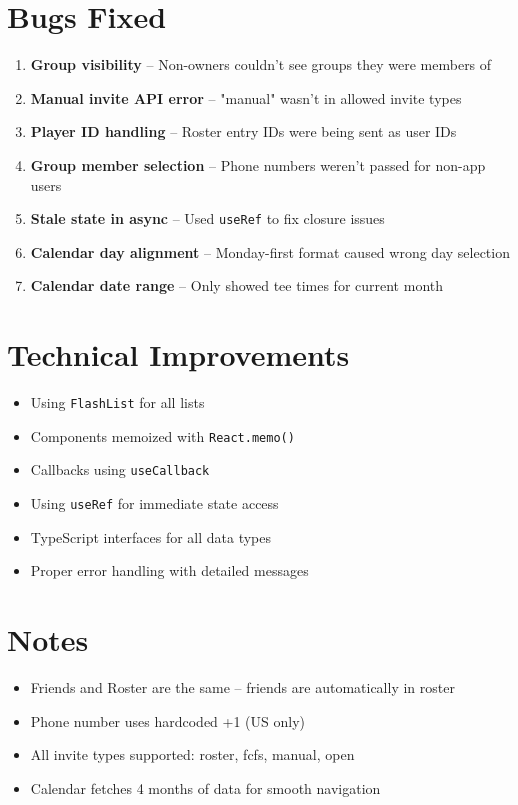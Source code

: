 \documentclass[11pt,a4paper]{article}
\newcommand{\done}{\textcolor{checkgreen}{$\checkmark$}}
\begin{document}
\section{Bugs Fixed}

\begin{enumerate}
    \item \textbf{Group visibility} -- Non-owners couldn't see groups they were members of
    \item \textbf{Manual invite API error} -- "manual" wasn't in allowed invite types
    \item \textbf{Player ID handling} -- Roster entry IDs were being sent as user IDs
    \item \textbf{Group member selection} -- Phone numbers weren't passed for non-app users
    \item \textbf{Stale state in async} -- Used \texttt{useRef} to fix closure issues
    \item \textbf{Calendar day alignment} -- Monday-first format caused wrong day selection
    \item \textbf{Calendar date range} -- Only showed tee times for current month
\end{enumerate}

\section{Technical Improvements}

\begin{itemize}[label=\done]
    \item Using \texttt{FlashList} for all lists
    \item Components memoized with \texttt{React.memo()}
    \item Callbacks using \texttt{useCallback}
    \item Using \texttt{useRef} for immediate state access
    \item TypeScript interfaces for all data types
    \item Proper error handling with detailed messages
\end{itemize}

\section{Notes}

\begin{itemize}
    \item Friends and Roster are the same -- friends are automatically in roster
    \item Phone number uses hardcoded +1 (US only)
    \item All invite types supported: roster, fcfs, manual, open
    \item Calendar fetches 4 months of data for smooth navigation
\end{itemize}
\end{document}
